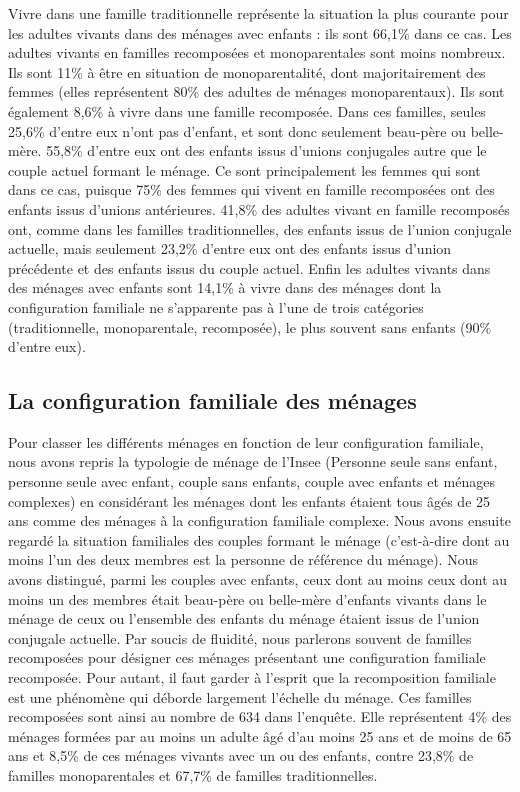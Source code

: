 \documentclass[
  12pt,
]{book}
\begin{document}
Vivre dans une famille traditionnelle représente la situation la plus
courante pour les adultes vivants dans des ménages avec enfants : ils
sont 66,1\% dans ce cas. Les adultes vivants en familles recomposées et
monoparentales sont moins nombreux. Ils sont 11\% à être en situation de
monoparentalité, dont majoritairement des femmes (elles représentent
80\% des adultes de ménages monoparentaux). Ils sont également 8,6\% à
vivre dans une famille recomposée. Dans ces familles, seules 25,6\%
d'entre eux n'ont pas d'enfant, et sont donc seulement beau-père ou
belle-mère. 55,8\% d'entre eux ont des enfants issus d'unions conjugales
autre que le couple actuel formant le ménage. Ce sont principalement les
femmes qui sont dans ce cas, puisque 75\% des femmes qui vivent en
famille recomposées ont des enfants issus d'unions antérieures. 41,8\%
des adultes vivant en famille recomposés ont, comme dans les familles
traditionnelles, des enfants issus de l'union conjugale actuelle, mais
seulement 23,2\% d'entre eux ont des enfants issus d'union précédente et
des enfants issus du couple actuel. Enfin les adultes vivants dans des
ménages avec enfants sont 14,1\% à vivre dans des ménages dont la
configuration familiale ne s'apparente pas à l'une de trois catégories
(traditionnelle, monoparentale, recomposée), le plus souvent sans
enfants (90\% d'entre eux).

\subsection{La configuration familiale des
ménages}\label{la-configuration-familiale-des-muxe9nages}

Pour classer les différents ménages en fonction de leur configuration
familiale, nous avons repris la typologie de ménage de l'Insee (Personne
seule sans enfant, personne seule avec enfant, couple sans enfants,
couple avec enfants et ménages complexes) en considérant les ménages
dont les enfants étaient tous âgés de 25 ans comme des ménages à la
configuration familiale complexe. Nous avons ensuite regardé la
situation familiales des couples formant le ménage (c'est-à-dire dont au
moins l'un des deux membres est la personne de référence du ménage).
Nous avons distingué, parmi les couples avec enfants, ceux dont au moins
ceux dont au moins un des membres était beau-père ou belle-mère
d'enfants vivants dans le ménage de ceux ou l'ensemble des enfants du
ménage étaient issus de l'union conjugale actuelle. Par soucis de
fluidité, nous parlerons souvent de familles recomposées pour désigner
ces ménages présentant une configuration familiale recomposée. Pour
autant, il faut garder à l'esprit que la recomposition familiale est une
phénomène qui déborde largement l'échelle du ménage. Ces familles
recomposées sont ainsi au nombre de 634 dans l'enquête. Elle
représentent 4\% des ménages formées par au moins un adulte âgé d'au
moins 25 ans et de moins de 65 ans et 8,5\% de ces ménages vivants avec
un ou des enfants, contre 23,8\% de familles monoparentales et 67,7\% de
familles traditionnelles.
\end{document}
